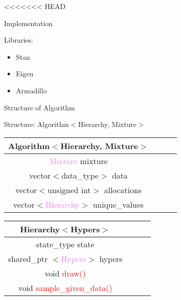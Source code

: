 <<<<<<< HEAD



\begin{frame}{Implementation}

Libraries:
\begin{itemize}
		\item Stan
		\item Eigen
		\item Armadillo
\end{itemize}
\end{frame}

\begin{frame}{Structure of Algorithm}

Structure:
 Algorithm$<$Hierarchy, Mixture$>$
\begin{center}
\begin{tabular}{ |c|c|c|c| } 
\hline
 Algorithm$<$Hierarchy, Mixture$>$ \\
\hline
 \textcolor{violet}{Mixture} mixture\\
 vector$<$data\_type$>$ data  \\ 
 vector$<$unsigned int$>$ allocations  \\
 vector$<$\textcolor{violet}{Hierarchy}$>$ unique\_values \\
\hline
\end{tabular}
\end{center}



\begin{center}
\begin{tabular}{ |c|c|c|c| } 
\hline
Hierarchy$<$Hypers$>$ \\
\hline
 state\_type state  \\ 
 shared\_ptr $<$\textcolor{violet}{Hypers}$>$ hypers \\
 void \textcolor{red}{draw()} \\
 void \textcolor{red}{sample\_given\_data()} \\
\hline
\end{tabular}
\end{center}

	
\end{frame}



